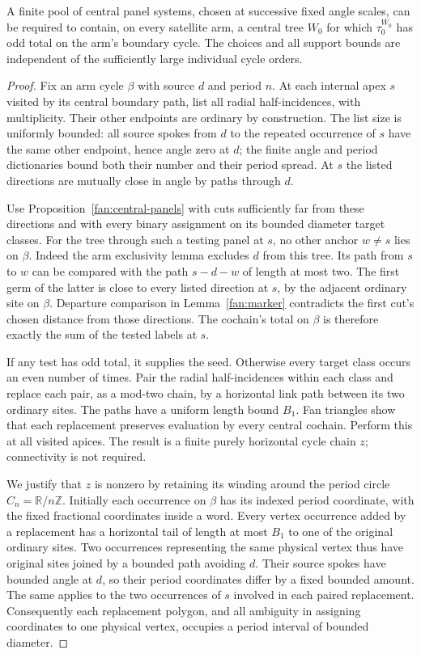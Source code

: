 \begin{proposition}\label{fan:odd-seeds}
A finite pool of central panel systems, chosen at successive fixed
angle scales, can be required to contain, on every satellite arm, a
central tree $W_0$ for which $\tau_0^{W_0}$ has odd total on the arm's
boundary cycle.  The choices and all support bounds are independent
of the sufficiently large individual cycle orders.
\end{proposition}

\begin{proof}
Fix an arm cycle $\beta$ with source $d$ and period $n$.
At each internal apex $s$ visited by its central boundary path, list
all radial half-incidences, with multiplicity.  Their other endpoints
are ordinary by construction.  The list size is uniformly bounded:
all source spokes from $d$ to the repeated occurrence of $s$ have the
same other endpoint, hence angle zero at $d$; the finite angle
and period dictionaries bound both their number and their period
spread.  At $s$ the listed directions are mutually close in angle by
paths through $d$.

Use Proposition~\ref{fan:central-panels} with cuts sufficiently far
from these directions and with every binary assignment on its bounded
diameter target classes.  For the tree through such a testing panel
at $s$, no other anchor $w\ne s$ lies on $\beta$.  Indeed the arm
exclusivity lemma excludes $d$ from this tree.  Its path from $s$ to
$w$ can be compared with the path $s\!-\!d\!-\!w$ of length at most
two.  The first germ of the latter is close to every listed direction
at $s$, by the adjacent ordinary site on $\beta$.  Departure comparison
in Lemma~\ref{fan:marker} contradicts the first cut's chosen distance
from those directions.  The cochain's total on $\beta$ is therefore
exactly the sum of the tested labels at $s$.

If any test has odd total, it supplies the seed.  Otherwise every
target class occurs an even number of times.  Pair the radial
half-incidences within each class and replace each pair, as a mod-two
chain, by a horizontal link path between its two ordinary sites.
The paths have a uniform length bound $B_1$.  Fan triangles show that
each replacement preserves evaluation by every central cochain.
Perform this at all visited apices.  The result is a finite purely
horizontal cycle chain $z$; connectivity is not required.

We justify that $z$ is nonzero by retaining its winding around the
period circle $C_n=\mathbb R/n\mathbb Z$.  Initially each occurrence
on $\beta$ has its indexed period coordinate, with the fixed
fractional coordinates inside a word.  Every vertex occurrence added
by a replacement has a horizontal tail of length at most $B_1$ to
one of the original ordinary sites.  Two occurrences representing the
same physical vertex thus have original sites joined by a bounded
path avoiding $d$.  Their source spokes have bounded angle at $d$,
so their period coordinates differ by a fixed bounded amount.
The same applies to the two occurrences of $s$ involved in each
paired replacement.  Consequently each replacement polygon, and
all ambiguity in assigning coordinates to one physical vertex,
occupies a period interval of bounded diameter.


\end{proof}

